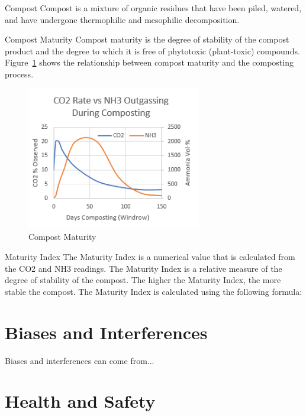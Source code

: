\documentclass[12pt]{../SOP4_alpha}\usepackage[]{graphicx}\usepackage[]{xcolor}
\begin{document}
\begin{description*}

\item[Compost] Compost is a mixture of organic residues that have been piled, watered, and have undergone thermophilic and mesophilic decomposition.

\item[Compost Maturity] Compost maturity is the degree of stability of the compost product and the degree to which it is free of phytotoxic (plant-toxic) compounds. Figure~\ref{fig:CompostMaturity} shows the relationship between compost maturity and the composting process.

\begin{figure}[htbp]
   \centering
   \includegraphics[width=3in]{graphics/CompostCO2NH3} 
   \caption{Compost Maturity}
   \label{fig:CompostMaturity}
\end{figure}



\item[Maturity Index] The Maturity Index is a numerical value that is calculated from the CO2 and NH3 readings. The Maturity Index is a relative measure of the degree of stability of the compost. The higher the Maturity Index, the more stable the compost. The Maturity Index is calculated using the following formula:

\end{description*}

\section{Biases and Interferences}

\NP Biases and interferences can come from...



\section{Health and Safety}
\end{document}
